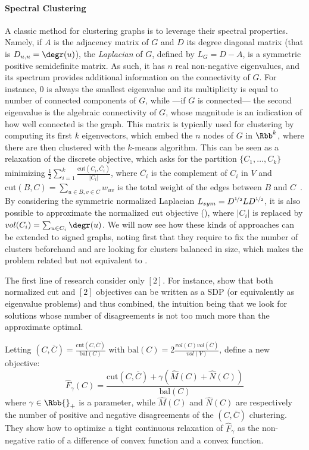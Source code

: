 \paragraph{Spectral Clustering}

A classic method for clustering graphs is to leverage their spectral properties. Namely, if $A$ is
the adjacency matrix of $G$ and $D$ its degree diagonal matrix (that is $D_{u,u} = \degr(u)$), the
\emph{Laplacian} of $G$, defined by $L_G = D - A$, is a symmetric positive semidefinite matrix. As
such, it has $n$ real non-negative eigenvalues, and its spectrum provides additional information on
the connectivity of $G$. For instance, $0$ is always the smallest eigenvalue and its multiplicity is
equal to number of connected components of $G$, while ---if $G$ is connected--- the second
eigenvalue is the algebraic connectivity of $G$, whose magnitude is an indication of how well
connected is the graph. This matrix is typically used for clustering by computing its first $k$
eigenvectors, which embed the $n$ nodes of $G$ in $\Rbb^k$, where there are then clustered with the
$k$-means algorithm. This can be seen as a relaxation of the discrete \rcut{} objective, which asks
for the partition $\{C_1, \ldots, C_k\}$ minimizing $\frac{1}{2}\sum_{i=1}^k \frac{\mathrm{cut}(C_i,
\bar{C_i})}{|C_i|}$, where $\bar{C_i}$ is the complement of $C_i$ in $V$ and $\mathrm{cut}(B, C) =
\sum_{u\in B, v\in C} w_{uv}$ is the total weight of the edges between $B$ and
$C$~\autocite{tutoSpectralClustering07}. By considering the symmetric normalized Laplacian
$L_{sym}  = D^{\nicefrac{1}{2}}LD^{\nicefrac{1}{2}}$, it is also possible to approximate the
normalized cut objective (\ncut{}), where $|C_i|$ is replaced by $vol(C_i) = \sum_{u\in C_i}
\degr(u)$. We will now see how these kinds of approaches can be extended to signed graphs, noting
first that they require to fix the number of clusters beforehand and are looking for clusters
balanced in size, which makes the problem related but not equivalent to \pcc{}.

The first line of research consider only \mind{}$[2]$. For instance, \textcite{NcutAnd2CC08} show
that both normalized cut and \mind{}$[2]$ objectives can be written as a SDP (or equivalently as
eigenvalue problems) and thus combined, the intuition being that we look for \ncut{} solutions whose
number of disagreements is not too much more than the approximate optimal.

Letting \ncut{}$(C, \bar{C}) = \frac{\mathrm{cut}(C, \bar{C})}{\mathrm{bal}(C)}$ with
$\mathrm{bal}(C) = 2\frac{vol(C)vol(\bar{C})}{vol(V)}$, \textcite{mOneCC12} define a new objective:
\begin{equation*}
  \hat{F}_\gamma(C) = \frac{\mathrm{cut}(C, \bar{C}) + \gamma\left(\hat{M}(C)+\hat{N}(C)\right)}{\mathrm{bal}(C)}
\end{equation*}
where $\gamma \in \Rbb{}_+$ is a parameter, while $\hat{M}(C)$ and $\hat{N}(C)$ are respectively the
number of positive and negative disagreements of the $(C, \bar{C})$ clustering.
They show how to optimize a tight continuous relaxation of $\hat{F}_\gamma$ as the non-negative
ratio of a difference of convex function and a convex function.

